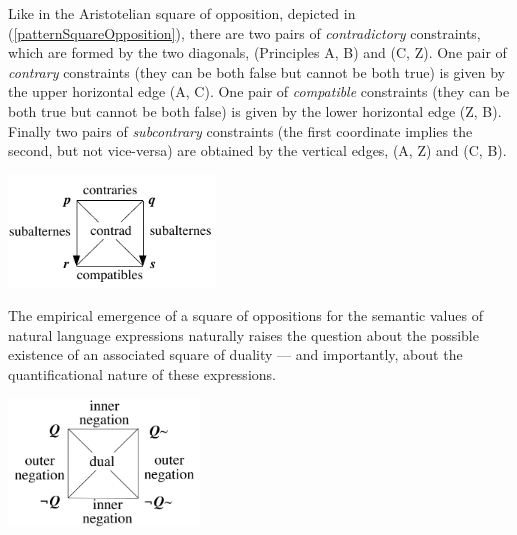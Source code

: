 \documentclass[output=paper
,modfonts
,nonflat]{langsci/langscibook}
\begin{document}

Like in the Aristotelian square of opposition, depicted in (\ref{patternSquareOpposition}), there are two pairs of {\em contradictory} constraints, which are formed
by the two diagonals, (Principles A, B) and (C, Z). One pair of {\em contrary}
constraints (they can be both false but cannot be both true) is given
by the upper horizontal edge (A, C).  One pair of {\em compatible}
constraints (they can be both true but cannot be both false) is given
by the lower horizontal edge (Z, B). Finally two pairs of
{\em subcontrary} constraints (the first coordinate implies the second,
but not vice-versa) are obtained by the vertical edges, (A, Z) and (C,
B).


\begin{exe}
\ex
\label{patternSquareOpposition}
\end{exe}
\vspace{-10mm}
\centerline{\includegraphics[width=13pc]{figures/patternSquareOpposition.pdf}}



The empirical
emergence of a square of oppositions for the semantic values of natural
language expressions naturally raises the question about the possible
existence of an associated square of duality --- and importantly,
about the quantificational nature of these expressions. 

\pagebreak
{}
\begin{exe}
\ex
\label{patternSquareDuality}
\end{exe}
\vspace{-7mm}
\centerline{\includegraphics[width=12pc]{figures/patternSquareDuality.pdf}}
\end{document}
